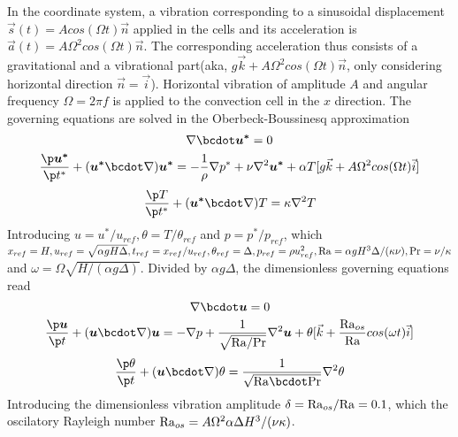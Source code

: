 \documentclass{hmj}
\newcommand\Pra{\mbox{\textrm{Pr}}} %
\newcommand\Ra{\mbox{\textrm{Ra}}} %
\begin{document}
\begin{tcolorbox}[colback=blue!5!white,colframe=blue!75!black,title=The governing equations]
In the coordinate system, a vibration corresponding to a sinusoidal displacement $\vec{s}(t)=Acos(\Omega t)\vec{n}$ applied in the cells and its acceleration is $\vec{a}(t)=A\Omega^2cos(\Omega t)\vec{n}$. The corresponding acceleration thus consists of a gravitational and a vibrational part(aka, $g\vec{k} + A\Omega^2cos(\Omega t)\vec{n}$, only considering horizontal direction $\vec{n}=\vec{i}$). Horizontal vibration of amplitude $A$ and angular frequency $\Omega=2\pi f$ is applied to the convection cell in the $x$ direction. The governing equations  are solved in the Oberbeck-Boussinesq approximation
\begin{equation}
  \nabla\bcdot\boldsymbol{u^*}=0 
\label{Eq1.1}
\end{equation}
\begin{equation}
\begin{aligned}
  \dfrac{\p \boldsymbol{u^*}}{\p t^*} +(\boldsymbol{u^*}\bcdot\nabla)\boldsymbol{u^*}=-\dfrac{1}{\rho}\nabla p^*+\nu\nabla^{2}\boldsymbol{u^*}+\alpha T[g\vec{k} + A\Omega^2cos(\Omega t)\vec{i} ] 
\label{Eq1.2}
\end{aligned}
\end{equation}
\begin{equation}
  \dfrac{\p T}{\p t^*}+(\boldsymbol{u^*}\bcdot\nabla)T=\kappa\nabla^{2}T
\label{Eq1.3}
\end{equation}
 Introducing $u = u^*/u_{ref},\theta =  T/\theta_{ref}$ and $p = p^*/p_{ref}$, which $x_{ref}=H, u_{ref}=\sqrt{\alpha g H \Delta}, t_{ref}=x_{ref}/u_{ref},\theta_{ref}=\Delta,p_{ref}=\rho u_{ref}^2,\Ra=\alpha g H^3 \Delta /(\kappa \nu),\Pra = \nu/\kappa$ and $\omega = \Omega \sqrt{H/(\alpha g \Delta)}$. Divided by $\alpha g \Delta$, the  dimensionless governing equations read
\begin{equation}
  \nabla\bcdot\boldsymbol{u}=0 \\
  \label{Eq1.4}
\end{equation}
\begin{equation}
  \dfrac{\p \boldsymbol{u}}{\p t}+(\boldsymbol{u}\bcdot\nabla)\boldsymbol{u}=-\nabla p+\dfrac{1}{\sqrt{\Ra/\Pra}}\nabla^{2}\boldsymbol{u}+\theta[\vec{k} + \dfrac{\Ra_{os}}{\Ra} cos(\omega t)\vec{i}]
  \label{Eq1.5}
\end{equation}
\begin{equation}
  \dfrac{\p \theta}{\p t}+(\boldsymbol{u}\bcdot\nabla)\theta=\dfrac{1}{\sqrt {\Ra\bcdot \Pra}}\nabla^{2}\theta
  \label{Eq1.6}
\end{equation}
Introducing the dimensionless vibration amplitude $\delta = \Ra_{os}/\Ra=0.1$, which the oscilatory Rayleigh number $\Ra_{os}=A\Omega^2 \alpha \Delta H^3/(\nu\kappa)$. 
\end{tcolorbox}
\end{document}
